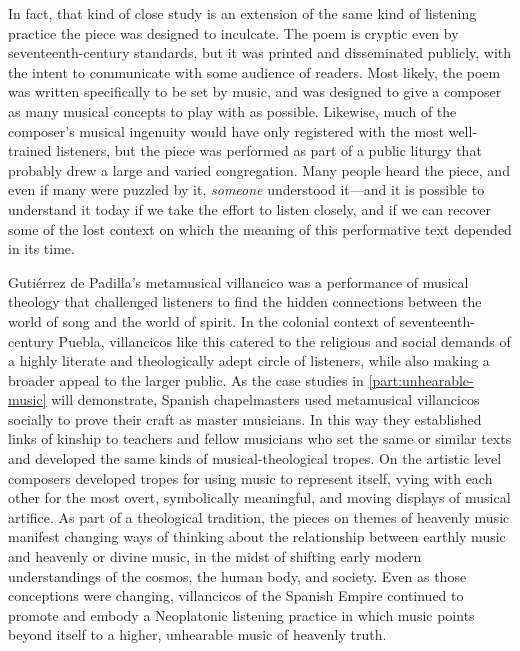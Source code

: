 In fact, that kind of close study is an extension of the same kind of listening
practice the piece was designed to inculcate.
The poem is cryptic even by seventeenth-century standards, but it was printed
and disseminated publicly, with the intent to communicate with some audience of
readers.
Most likely, the poem was written specifically to be set by music, and was
designed to give a composer as many musical concepts to play with as possible.
Likewise, much of the composer's musical ingenuity would have only registered
with the most well-trained listeners, but the piece was performed as part of a
public liturgy that probably drew a large and varied congregation.
Many people heard the piece, and even if many were puzzled by it, \emph{someone}
understood it---and it is possible to understand it today if we take the effort
to listen closely, and if we can recover some of the lost context on which the
meaning of this performative text depended in its time.


Gutiérrez de Padilla's metamusical villancico was a performance of musical
theology that challenged listeners to find the hidden connections between the
world of song and the world of spirit.
In the colonial context of seventeenth-century Puebla, villancicos like this
catered to the religious and social demands of a highly literate and
theologically adept circle of listeners, while also making a broader appeal to
the larger public.
As the case studies in \cref{part:unhearable-music} will demonstrate, Spanish
chapelmasters used metamusical villancicos socially to prove their craft as
master musicians.
In this way they established links of kinship to teachers and fellow musicians
who set the same or similar texts and developed the same kinds of
musical-theological tropes.
On the artistic level composers developed tropes for using music to represent
itself, vying with each other for the most overt, symbolically meaningful, and
moving displays of musical artifice.
As part of a theological tradition, the pieces on themes of heavenly music
manifest changing ways of thinking about the relationship between earthly music
and heavenly or divine music, in the midst of shifting early modern
understandings of the cosmos, the human body, and society.
Even as those conceptions were changing, villancicos of the Spanish Empire
continued to promote and embody a Neoplatonic listening practice in which music
points beyond itself to a higher, unhearable music of heavenly truth.

